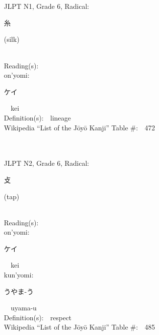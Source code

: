 \begin{multicols}{2}
\ \ \\
{\fontsize{34pt}{40pt}  }\ \ \\  %
{JLPT N1, Grade 6, Radical:\ \ {\begin{CJK}{UTF8}{min} 糸 \end{CJK}} (silk) } \\
Reading(s):\ \ \\
{\hspace*{1em}}on'yomi:\ \ \\
{\hspace*{2em}}{\begin{CJK}{UTF8}{min} ケイ \end{CJK}}\ \ kei\ \ \\
Definition(s):\ \ lineage \\
Wikipedia ``List of the J\=oy\=o Kanji'' Table \#:\ \ 472 \\
\ \ \\
{\fontsize{34pt}{40pt}  }\ \ \\  %
{JLPT N2, Grade 6, Radical:\ \ {\begin{CJK}{UTF8}{min} 攴 \end{CJK}} (tap) } \\
Reading(s):\ \ \\
{\hspace*{1em}}on'yomi:\ \ \\
{\hspace*{2em}}{\begin{CJK}{UTF8}{min} ケイ \end{CJK}}\ \ kei\ \ \\
{\hspace*{1em}}kun'yomi:\ \ \\
{\hspace*{2em}}{\begin{CJK}{UTF8}{min} うやま-う \end{CJK}}\ \ uyama-u\ \ \\
Definition(s):\ \ respect \\
Wikipedia ``List of the J\=oy\=o Kanji'' Table \#:\ \ 485 \\
\ \ \\
{\fontsize{34pt}{40pt}  }\ \ \\  %

\end{multicols}
